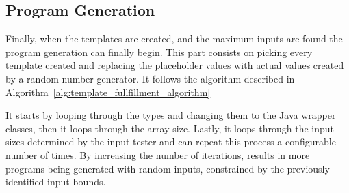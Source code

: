 \subsection{Program Generation} \label{sec:work_stage1_program_generation}

Finally, when the templates are created, and the maximum inputs are found the program generation can finally begin. This part consists on picking every template created and replacing the placeholder values with actual values created by a random number generator. It follows the algorithm described in Algorithm~\ref{alg:template_fullfillment_algorithm}

It starts by looping through the types and changing them to the Java wrapper classes, then it loops through the array size. Lastly, it loops through the input sizes determined by the input tester and can repeat this process a configurable number of times. By increasing the number of iterations, results in more programs being generated with random inputs, constrained by the previously identified input bounds. 




